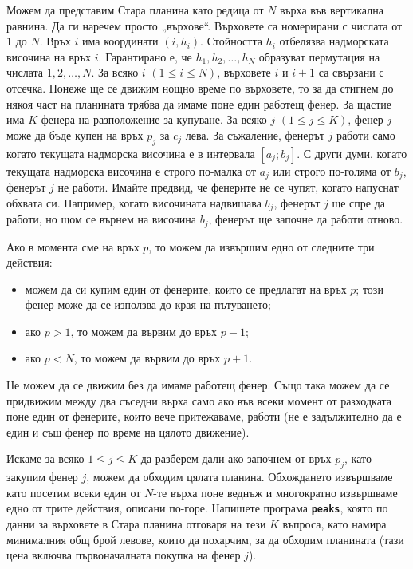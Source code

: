 \documentclass[12pt]{article}
\begin{document}
\renewcommand{\headerLang}{Български}
\renewcommand{\problemName}{?. PEAKS}

\renewcommand{\headerLeft}{IATI Day 1, Senior group}
\renewcommand{\headerRightFirst}{XVIII INTERNATIONAL ADVANCED TOURNAMENT IN INFORMATICS}
\renewcommand{\headerRightSecond}{BURGAS 21.04.2027}

\problem{Задача \problemName}{$3$ сек.}{$256$ MB}

Можем да представим Стара планина като редица от $N$ върха във вертикална равнина. Да ги наречем просто „върхове“. Върховете са номерирани с числата от $1$ до $N$. Връх $i$ има координати $(i, h_i)$. Стойността $h_i$ отбелязва надморската височина на връх $i$. Гарантирано е, че $h_1, h_2, \dots, h_ N$ образуват пермутация на числата $1, 2, \dots,  N$. За всяко $i$ $(1 \le i \le  N)$, върховете $i$ и $i+1$ са свързани с отсечка. Понеже ще се движим нощно време по върховете, то за да стигнем до някоя част на планината трябва да имаме поне един работещ фенер. За щастие има $K$ фенера на разположение за купуване. За всяко $j$ $(1 \le j \le K)$, фенер $j$ може да бъде купен на връх $p_j$ за $c_j$ лева. За съжаление, фенерът $j$ работи само когато текущата надморска височина е в интервала $[a_j; b_j]$. С други думи, когато текущата надморска височина е строго по-малка от $a_j$ или строго по-голяма от $b_j$, фенерът $j$ не работи. Имайте предвид, че фенерите не се чупят, когато напуснат обхвата си. Например, когато височината надвишава $b_j$, фенерът $j$ ще спре да работи, но щом се върнем на височина $b_j$, фенерът ще започне да работи отново.

Ако в момента сме на връх $p$, то можем да извършим едно от следните три действия:
\begin{itemize}
	\item можем да си купим един от фенерите, които се предлагат на връх $p$; този фенер може да се използва до края на пътуването;
	\item ако $p > 1$, то можем да вървим до връх $p-1$;
	\item ако $p <  N$, то можем да вървим до връх $p+1$.
\end{itemize}
Не можем да се движим без да имаме работещ фенер. Също така можем да се придвижим между два съседни върха само ако във всеки момент от разходката поне един от фенерите, които вече притежаваме, работи (не е задължително да е един и същ фенер по време на цялото движение).

Искаме за всяко $1 \le j \le K$ да разберем дали ако започнем от връх $p_j$, като закупим фенер $j$, можем да обходим цялата планина. Обхождането извършваме като посетим всеки един от $N$-те върха поне веднъж и многократно извършваме едно от трите действия, описани по-горе. Напишете програма \textbf{\texttt{peaks}}, която по данни за върховете в Стара планина отговаря на тези $K$ въпроса, като намира минималния общ брой левове, които да похарчим, за да обходим планината (тази цена включва първоначалната покупка на фенер $j$).
\end{document}
